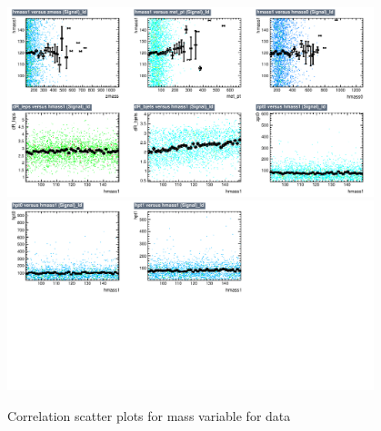 \begin{figure}[!htb]%
\centering
\includegraphics[width=0.95\textwidth]{figures/CRTT/dataset/plots/correlationscatter_hmass1__Id_c1.pdf}
\includegraphics[width=0.95\textwidth]{figures/CRTT/dataset/plots/correlationscatter_hmass1__Id_c2.pdf}
\caption{ Correlation scatter plots for \HBB mass  variable for data}%
\label{fig:correlations_CRTT_hmass1_S}                                                       
\end{figure}


